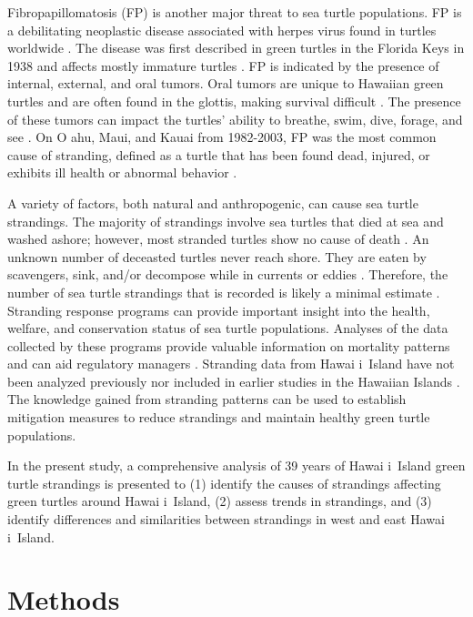 \documentclass[sn-basic,NameDate]{sn-jnl}\usepackage[]{graphicx}\usepackage[]{xcolor}
\DeclareRobustCommand{\okina}{%
  \raisebox{\dimexpr\fontcharht\font`A-\height}{%
    \scalebox{0.8}{`}%
  }%
}
\newcommand{\Hawaii}{Hawai\okina i}
\newcommand{\Oahu}{O\okina ahu}
\begin{document}
Fibropapillomatosis (FP) is another major threat to sea turtle populations. 
FP is a debilitating neoplastic disease associated with herpes virus found in turtles worldwide \citep{jacobson1991herpesvirus, herbst1994fibropapillomatosis}.
The disease was first described in green turtles in the Florida Keys in 1938 and affects mostly immature turtles \citep{herbst1994fibropapillomatosis}. 
FP is indicated by the presence of internal, external, and oral tumors. 
Oral tumors are unique to Hawaiian green turtles and are often found in the glottis, making survival difficult \citep{work2004retrospective}.
The presence of these tumors can impact the turtles' ability to breathe, swim, dive, forage, and see \citep{perrault2021insights}. 
On \Oahu, Maui, and Kauai from 1982-2003, FP was the most common cause of stranding, defined as a turtle that has been found dead, injured, or exhibits ill health or abnormal behavior \citep{chaloupka2008cause}. 

A variety of factors, both natural and anthropogenic, can cause sea turtle strandings. 
The majority of strandings involve sea turtles that died at sea and washed ashore; however, most stranded turtles show no cause of death \citep{hart2006interpreting}. 
An unknown number of deceasted turtles never reach shore.
They are eaten by scavengers, sink, and/or decompose while in currents or eddies \citep{crowder1995effects, hart2006interpreting}. 
Therefore, the number of sea turtle strandings that is recorded is likely a minimal estimate \citep{hart2006interpreting}. 
Stranding response programs can provide important insight into the health, welfare, and conservation status of sea turtle populations. Analyses of the data collected by these programs provide valuable information on mortality patterns and can aid regulatory managers \citep{crowder1995effects}. 
Stranding data from \Hawaii\  Island have not been analyzed previously nor included in earlier studies in the Hawaiian Islands \citep{chaloupka2008cause}. 
The knowledge gained from stranding patterns can be used to establish mitigation measures to reduce strandings and maintain healthy green turtle populations.  

In the present study, a comprehensive analysis of 39 years of \Hawaii\ Island green turtle strandings is presented to (1) identify the causes of strandings affecting green turtles around \Hawaii\  Island, (2) assess trends in strandings, and (3) identify differences and similarities between strandings in west and east \Hawaii\ Island. 

\section{Methods}
\end{document}
